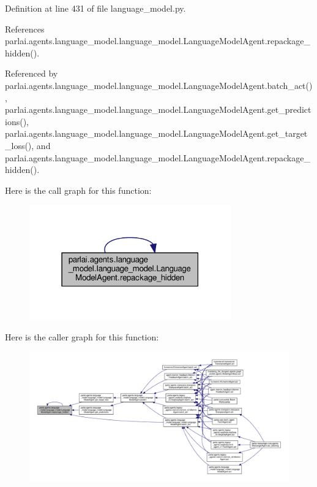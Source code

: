 Definition at line 431 of file language\+\_\+model.\+py.



References parlai.\+agents.\+language\+\_\+model.\+language\+\_\+model.\+Language\+Model\+Agent.\+repackage\+\_\+hidden().



Referenced by parlai.\+agents.\+language\+\_\+model.\+language\+\_\+model.\+Language\+Model\+Agent.\+batch\+\_\+act(), parlai.\+agents.\+language\+\_\+model.\+language\+\_\+model.\+Language\+Model\+Agent.\+get\+\_\+predictions(), parlai.\+agents.\+language\+\_\+model.\+language\+\_\+model.\+Language\+Model\+Agent.\+get\+\_\+target\+\_\+loss(), and parlai.\+agents.\+language\+\_\+model.\+language\+\_\+model.\+Language\+Model\+Agent.\+repackage\+\_\+hidden().

Here is the call graph for this function\+:
\nopagebreak
\begin{figure}[H]
\begin{center}
\leavevmode
\includegraphics[width=247pt]{classparlai_1_1agents_1_1language__model_1_1language__model_1_1LanguageModelAgent_aa54ff09a8edc6ae51ac8be33aeb4acc8_cgraph}
\end{center}
\end{figure}
Here is the caller graph for this function\+:
\nopagebreak
\begin{figure}[H]
\begin{center}
\leavevmode
\includegraphics[width=350pt]{classparlai_1_1agents_1_1language__model_1_1language__model_1_1LanguageModelAgent_aa54ff09a8edc6ae51ac8be33aeb4acc8_icgraph}
\end{center}
\end{figure}
